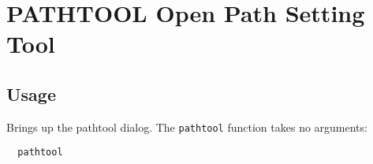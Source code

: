 \section{PATHTOOL Open Path Setting Tool}

\subsection{Usage}

Brings up the pathtool dialog.  The \verb|pathtool| function takes
no arguments:
\begin{verbatim}
  pathtool
\end{verbatim}
